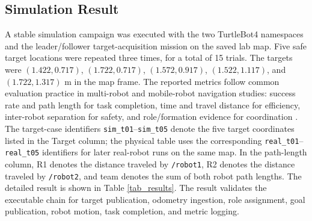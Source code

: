 \documentclass{ieeeaccess}
\begin{document}
\subsection{Simulation Result}
A stable simulation campaign was executed with the two TurtleBot4 namespaces and the leader/follower target-acquisition mission on the saved lab map. Five safe target locations were repeated three times, for a total of 15 trials. The targets were $(1.422,0.717)$, $(1.722,0.717)$, $(1.572,0.917)$, $(1.522,1.117)$, and $(1.722,1.317)$ m in the map frame. The reported metrics follow common evaluation practice in multi-robot and mobile-robot navigation studies: success rate and path length for task completion, time and travel distance for efficiency, inter-robot separation for safety, and role/formation evidence for coordination \cite{Schneider2005Metrics,Wen2021MRPB,Skrynnik2025POGEMA}. The target-case identifiers \texttt{sim\_t01}--\texttt{sim\_t05} denote the five target coordinates listed in the Target column; the physical table uses the corresponding \texttt{real\_t01}--\texttt{real\_t05} identifiers for later real-robot runs on the same map. In the path-length column, R1 denotes the distance traveled by \texttt{/robot1}, R2 denotes the distance traveled by \texttt{/robot2}, and team denotes the sum of both robot path lengths. The detailed result is shown in Table \ref{tab_results}. The result validates the executable chain for target publication, odometry ingestion, role assignment, goal publication, robot motion, task completion, and metric logging.
\end{document}
